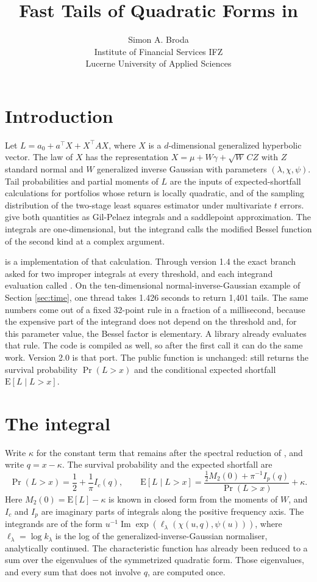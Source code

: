 \documentclass[article]{jss}
\author{Simon A. Broda\\Institute of Financial Services IFZ\\Lucerne University of Applied Sciences}
\title{Fast Tails of Quadratic Forms in \pkg{QuadraticFormsMGHyp.jl}}
\DeclareMathOperator{\Imag}{Im}
\begin{document}
\section{Introduction} \label{sec:intro}

Let $L=a_0+a^\top X+X^\top AX$, where $X$ is a $d$-dimensional generalized hyperbolic vector.
The law of $X$ has the representation $X=\mu+W\gamma+\sqrt{W}\,CZ$ with $Z$ standard normal and $W$ generalized inverse Gaussian with parameters $(\lambda,\chi,\psi)$.
Tail probabilities and partial moments of $L$ are the inputs of expected-shortfall calculations for portfolios whose return is locally quadratic, and of the sampling distribution of the two-stage least squares estimator under multivariate $t$ errors.
\citet{bz:21} give both quantities as Gil-Pelaez integrals \citep{gp:51} and a saddlepoint approximation.
The integrals are one-dimensional, but the integrand calls the modified Bessel function of the second kind at a complex argument.

 is a  \citep{julia} implementation of that calculation.
Through version 1.4 the exact branch asked  for two improper integrals at every threshold, and each integrand evaluation called .
On the ten-dimensional normal-inverse-Gaussian example of Section \ref{sec:time}, one thread takes 1.426 seconds to return 1{,}401 tails.
The same numbers come out of a fixed 32-point rule in a fraction of a millisecond, because the expensive part of the integrand does not depend on the threshold and, for this parameter value, the Bessel factor is elementary.
A  library already evaluates that rule.
The  code is compiled as well, so after the first call it can do the same work.
Version 2.0 is that port.
The public function is unchanged:  still returns the survival probability $\Pr(L>x)$ and the conditional expected shortfall $\mathrm{E}[L\mid L>x]$.

\section{The integral} \label{sec:integral}

Write $\kappa$ for the constant term that remains after the spectral reduction of \citet{bz:21}, and write $q=x-\kappa$.
The survival probability and the expected shortfall are
\begin{equation}
  \label{eq:tails}
  \Pr(L>x)=\frac12+\frac1\pi I_c(q),
  \qquad
  \mathrm{E}[L\mid L>x]
  =\frac{\tfrac12 M_2(0)+\pi^{-1}I_p(q)}{\Pr(L>x)}+\kappa.
\end{equation}
Here $M_2(0)=\mathrm{E}[L]-\kappa$ is known in closed form from the moments of $W$, and $I_c$ and $I_p$ are imaginary parts of integrals along the positive frequency axis.
The integrands are of the form $u^{-1}\Imag\exp(\ell_\lambda(\chi(u,q),\psi(u)))$, where $\ell_\lambda=\log k_\lambda$ is the log of the generalized-inverse-Gaussian normaliser, analytically continued.
The characteristic function has already been reduced to a sum over the eigenvalues of the symmetrized quadratic form.
Those eigenvalues, and every sum that does not involve $q$, are computed once.
\end{document}
